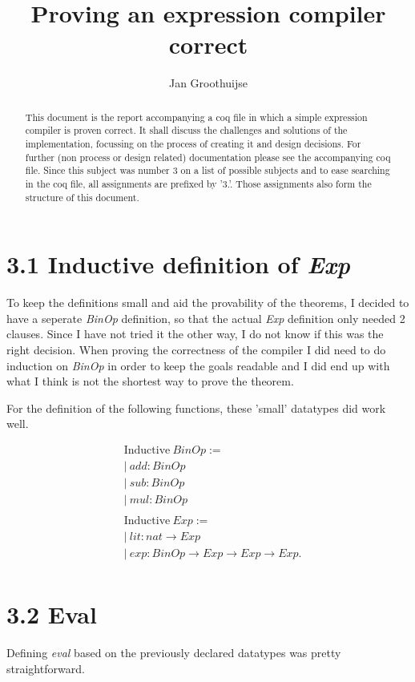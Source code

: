 \documentclass[10pt,a4paper,usenames,dvipnames]{article}
\author{ Jan Groothuijse }
\title{ Proving an expression compiler correct }
\begin{document}
\maketitle
\begin{abstract}
This document is the report accompanying a coq file in which a simple expression compiler is proven correct. 
It shall discuss the challenges and solutions of the implementation, focussing on the process of creating it and design decisions.
For further (non process or design related) documentation please see the accompanying coq file. Since this subject was number
3 on a list of possible subjects and to ease searching in the coq file, all assignments are prefixed by '3.'. 
Those assignments also form the structure of this document.
\end{abstract}

\section*{3.1 Inductive definition of \emph{Exp}}
To keep the definitions small and aid the provability of the theorems, I decided to have a seperate \emph{BinOp} definition, so that the actual \emph{Exp} definition only needed 2 clauses. Since I have not tried it the other way, I do not know if this was the right decision. When proving the correctness of the compiler I did need to do induction on \emph{BinOp} in order to keep the goals readable and I did end up with what I think is not the shortest way to prove the theorem.

For the definition of the following functions, these 'small' datatypes did work well.

\begin{align*}
& \text{Inductive} \: BinOp := \\
& \vert \: add : BinOp \\
& \vert \: sub : BinOp \\
& \vert \: mul : BinOp \\
\\
& \text{Inductive} \: Exp :=  \\
& | \: lit : nat \rightarrow Exp \\
& | \: exp : BinOp \rightarrow Exp \rightarrow Exp \rightarrow Exp. \\
\end{align*}

\section*{3.2 Eval }
Defining \emph{eval} based on the previously declared datatypes was pretty straightforward.
\end{document}
